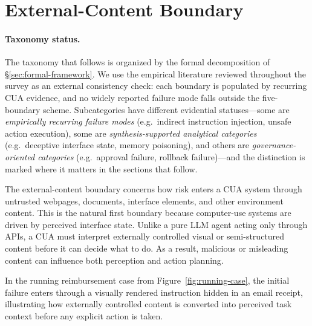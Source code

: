 \section{External-Content Boundary}
\label{sec:external-content}

\paragraph{Taxonomy status.}
The taxonomy that follows is organized by the formal decomposition of \S\ref{sec:formal-framework}. We use the empirical literature reviewed throughout the survey as an external consistency check: each boundary is populated by recurring CUA evidence, and no widely reported failure mode falls outside the five-boundary scheme. Subcategories have different evidential statuses---some are \emph{empirically recurring failure modes} (e.g.\ indirect instruction injection, unsafe action execution), some are \emph{synthesis-supported analytical categories} (e.g.\ deceptive interface state, memory poisoning), and others are \emph{governance-oriented categories} (e.g.\ approval failure, rollback failure)---and the distinction is marked where it matters in the sections that follow.

\medskip
The external-content boundary concerns how risk enters a CUA system through untrusted webpages, documents, interface elements, and other environment content. This is the natural first boundary because computer-use systems are driven by perceived interface state. Unlike a pure LLM agent acting only through APIs, a CUA must interpret externally controlled visual or semi-structured content before it can decide what to do. As a result, malicious or misleading content can influence both perception and action planning.

In the running reimbursement case from Figure~\ref{fig:running-case}, the initial failure enters through a visually rendered instruction hidden in an email receipt, illustrating how externally controlled content is converted into perceived task context before any explicit action is taken.


